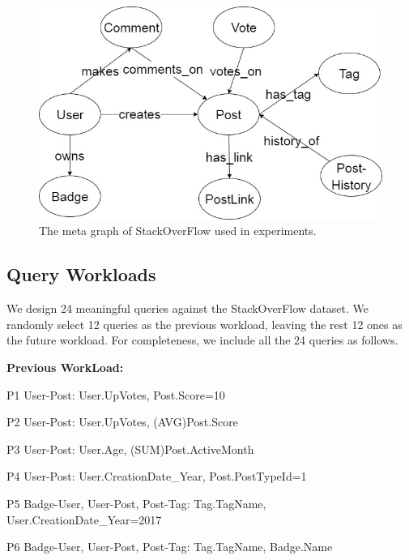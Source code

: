 \begin{figure}[H]
	\centering
	\includegraphics[scale=0.5]{pic/MetaExp}
	\caption{The meta graph of StackOverFlow used in experiments.}
	\label{fig:5:1}
\end{figure}  


\subsection{Query Workloads}
We design 24 meaningful queries against the StackOverFlow dataset. We randomly select 12 queries as the previous workload, leaving the rest 12 ones as the future workload. For completeness, we include all the 24 queries as follows. %


\textbf{Previous WorkLoad:}

P1 \hspace{3mm} User-Post: User.UpVotes, Post.Score=10

P2 \hspace{3mm} User-Post: User.UpVotes, (AVG)Post.Score

P3 \hspace{3mm} User-Post: User.Age, (SUM)Post.ActiveMonth

P4 \hspace{3mm} User-Post: User.CreationDate\_Year, Post.PostTypeId=1

P5 \hspace{3mm} Badge-User, User-Post, Post-Tag: Tag.TagName, User.CreationDate\_Year=2017

P6 \hspace{3mm} Badge-User, User-Post, Post-Tag: Tag.TagName, Badge.Name

